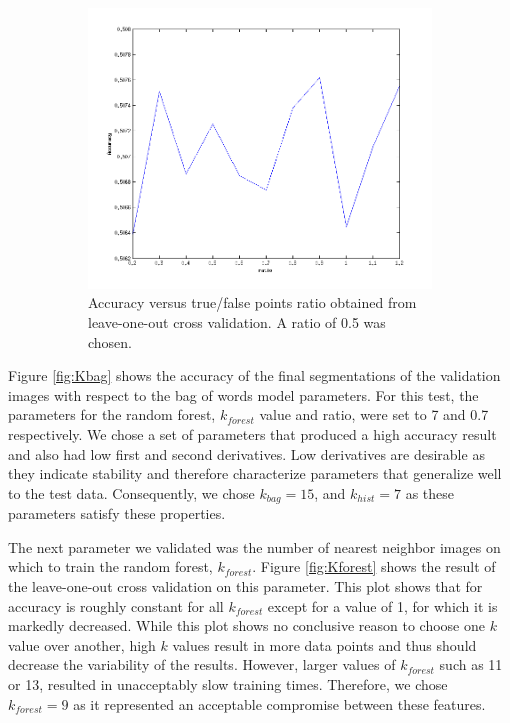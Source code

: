 \documentclass{article} %
\begin{document}
\begin{figure}[htb]
\begin{subfigure}[t]{0.33\textwidth}
	\end{subfigure}
	\begin{subfigure}[t]{0.33\textwidth}
		\centering
		\includegraphics[width = \textwidth]{./img/ratio}
		\parbox{0.95\textwidth}{\caption{Accuracy versus true/false points ratio obtained from leave-one-out cross validation. A ratio  of 0.5 was chosen. \label{fig:ratio}}}
	\end{subfigure}

	\caption{}
\end{figure}

Figure \ref{fig:Kbag} shows the accuracy of the final segmentations of the validation images with respect to the bag of words model parameters. 
For this test, the parameters for the random forest, $k_{forest}$ value and ratio, were set to 7 and 0.7 respectively. 
We chose a set of parameters that produced a high accuracy result and also had low first and second derivatives. Low derivatives are desirable as they indicate stability and therefore characterize parameters that generalize well to the test data.
Consequently, we chose $k_{bag} = 15$, and $k_{hist} = 7$ as these parameters satisfy these properties.

The next parameter we validated was the number of nearest neighbor images on which to train the random forest, $k_{forest}$. 
Figure \ref{fig:Kforest} shows the result of the leave-one-out cross validation on this parameter. This plot shows that for accuracy is roughly constant for all $k_{forest}$ except for a value of 1, for which it is markedly decreased. 
While this plot shows no conclusive reason to choose one $k$ value over another, high $k$ values result in more data points and thus should decrease the variability of the results. 
However, larger values of $k_{forest}$ such as 11 or 13, resulted in unacceptably slow training times. 
Therefore, we chose $k_{forest} = 9$ as it represented an acceptable compromise between these features.
\end{document}
